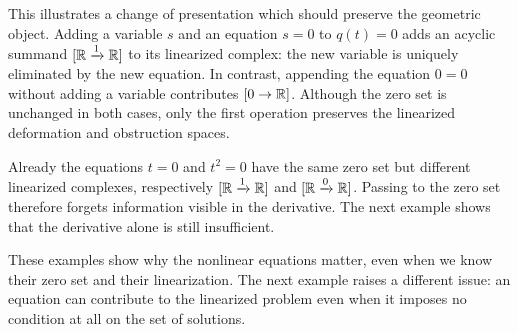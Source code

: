 This illustrates a change of presentation which should preserve the geometric
object. Adding a variable $s$ and an equation $s=0$ to $q(t)=0$ adds an
acyclic summand $[\mathbb{R}\xrightarrow{1}\mathbb{R}]$ to its linearized complex: the new
variable is uniquely eliminated by the new equation. In contrast, appending
the equation $0=0$ without adding a variable contributes $[0\to\mathbb{R}]$.
Although the zero set is unchanged in both cases, only the first operation
preserves the linearized deformation and obstruction spaces.

Already the equations $t=0$ and $t^2=0$ have the same zero set but different
linearized complexes, respectively $[\mathbb{R}\xrightarrow{1}\mathbb{R}]$ and
$[\mathbb{R}\xrightarrow{0}\mathbb{R}]$. Passing to the zero set therefore forgets
information visible in the derivative. The next example shows that the
derivative alone is still insufficient.


These examples show why the nonlinear equations matter, even when we know
their zero set and their linearization. The next example raises a different
issue: an equation can contribute to the linearized problem even when it
imposes no condition at all on the set of solutions.

